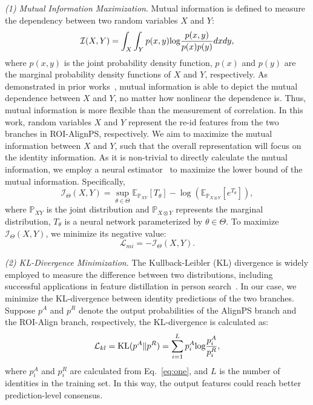 \documentclass[journal]{IEEEtran}
\begin{document}
\textit{(1) Mutual Information Maximization}. Mutual information is defined to measure the dependency between two random variables $X$ and $Y$:
\begin{equation}
    \mathcal{I}(X,Y) = \int_{X}\int_{Y}p(x,y) {\rm log}\frac{p(x,y)}{p(x)p(y)}dxdy,
\end{equation}
where $p(x,y)$ is the joint probability density function, $p(x)$ and $p(y)$ are the marginal probability density functions of $X$ and $Y$, respectively. As demonstrated in prior works~\cite{Kinney3354,DBLP:conf/iclr/HjelmFLGBTB19}, mutual information is able to depict the mutual dependence between $X$ and $Y$, no matter how nonlinear the dependence is. Thus, mutual information is more flexible than the measurement of correlation. In this work, random variables $X$ and $Y$ represent the re-id features from the two branches in ROI-AlignPS, respectively. We aim to maximize the mutual information between $X$ and $Y$, such that the overall representation will focus on the identity information. As it is non-trivial to directly calculate the mutual information, we employ a neural estimator~\cite{DBLP:conf/icml/BelghaziBROBHC18} to maximize the lower bound of the mutual information. Specifically, 
\begin{equation}
    \mathcal{I}_{\Theta}(X,Y)  =  \sup_{\theta\in\Theta} \mathbb{E}_{\mathbb{P}_{{X}{Y}}}[T_\theta] - \log(\mathbb{E}_{\mathbb{P}_{{X}\otimes{Y}}}[e^{T_\theta}]),
\end{equation}
where $\mathbb{P}_{{X}{Y}}$ is the joint distribution and $\mathbb{P}_{{X}\otimes{Y}}$ represents the marginal distribution, $T_{\theta}$ is a neural network parameterized by $\theta \in \Theta$. To maximize $\mathcal{I}_{\Theta}(X,Y) $, we minimize its negative value:
\begin{equation}
    \mathcal{L}_{mi} = -\mathcal{I}_{\Theta}(X,Y).
\end{equation}

\textit{(2) KL-Divergence Minimization}. 
The Kullback-Leibler (KL) divergence is widely employed to measure the difference between two distributions, including successful applications in feature distillation in person search~\cite{DBLP:conf/cvpr/DongZST20a,DBLP:conf/aaai/ZhangWBSY21}. In our case, we minimize the KL-divergence between identity predictions of the two branches. Suppose $p^{A}$ and $p^R$ denote the output probabilities of the AlignPS branch and the ROI-Align branch, respectively, the KL-divergence is calculated as:
\begin{align}
    \mathcal{L}_{kl} = {\rm KL} (p^A \| p^R) 
                     = \sum_{i=1}^{L} p_i^A {\rm log} \frac{p_i^A}{p_i^R},
\end{align}
where $p_i^A$ and $p_i^R$ are calculated from Eq.~\ref{eq:one}, and $L$ is the number of identities in the training set. In this way, the output features could reach better prediction-level consensus.
\end{document}
